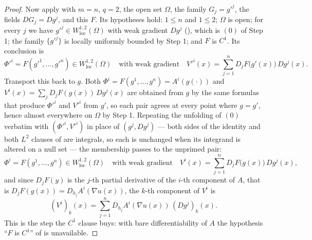 \begin{proof}
Now apply  with $m=n$, $q=2$, the open set
$\Omega$, the family $G_j=g'^j$, the fields $DG_j=Dg^j$, and this $F$.  Its
hypotheses hold: $1\le n$ and $1\le2$; $\Omega$ is open; for every $j$ we have
$g'^j\in W^{1,2}_{\mathrm{loc}}(\Omega)$ with weak gradient $Dg^j$
(), which is $(0)$ of Step 1; the family $\{g'^j\}$ is
locally uniformly bounded by Step 1; and $F$ is $C^1$.  Its conclusion is
\[
\Phi'^i=F(g'^1,\dots,g'^n)\in W^{1,2}_{\mathrm{loc}}(\Omega)
\quad\text{with weak gradient}\quad
V'^i(x)=\sum_{j=1}^nD_jF\bigl(g'(x)\bigr)\,Dg^j(x) .
\]
Transport this back to $g$.  Both $\Phi^i=F(g^1,\dots,g^n)=A^i(g(\cdot))$ and
$V^i(x)=\sum_jD_jF(g(x))\,Dg^j(x)$ are obtained from $g$ by the same formulas
that produce $\Phi'^i$ and $V'^i$ from $g'$, so each pair agrees at every point
where $g=g'$, hence almost everywhere on $\Omega$ by Step 1.  Repeating the
unfolding of $(0)$ verbatim with $(\Phi'^i,V'^i)$ in place of $(g^j,Dg^j)$ ---
both sides of the  identity and both $L^2$ clauses of
 are integrals, so each is unchanged when its integrand is
altered on a null set --- the membership passes to the unprimed pair:
\[
\Phi^i=F(g^1,\dots,g^n)\in W^{1,2}_{\mathrm{loc}}(\Omega)
\quad\text{with weak gradient}\quad
V^i(x)=\sum_{j=1}^nD_jF\bigl(g(x)\bigr)\,Dg^j(x) ,
\tag{1}
\]
and since $D_jF(y)$ is the $j$-th partial derivative of the $i$-th component of
$A$, that is $D_jF(g(x))=D_{h_j}A^i(\nabla u(x))$, the $k$-th component of
$V^i$ is
\[
(V^i)_k(x)=\sum_{j=1}^nD_{h_j}A^i(\nabla u(x))\,(Dg^j)_k(x) .
\tag{2}
\]
This is the step the $C^1$ clause buys: with bare differentiability of $A$ the
hypothesis ``$F$ is $C^1$'' of  is unavailable.


\end{proof}
